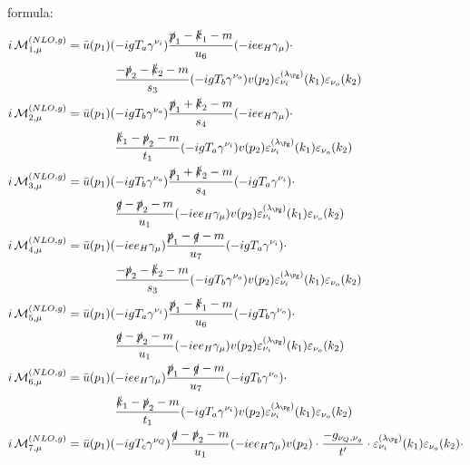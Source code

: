 formula:
\begin{align}
i\Md^{(NLO,g)}_{1,\mu} &= \bar u(p_1)(-igT_a\gamma^{\nu_i})\frac{\slashed{p}_1-\slashed{k}_1-m}{u_6}(-i e e_H \gamma_\mu)\cdot\nonumber\\
 &\hspace{40pt}\frac{-\slashed{p}_2-\slashed{k}_2-m}{s_3}(-igT_b\gamma^{\nu_o})v(p_2)\varepsilon^{(\lambda_{\Pg})}_{\nu_i}(k_1)\varepsilon_{\nu_o}(k_2)\\
i\Md^{(NLO,g)}_{2,\mu} &= \bar u(p_1)(-igT_b\gamma^{\nu_o})\frac{\slashed{p}_1+\slashed{k}_2-m}{s_4}(-i e e_H \gamma_\mu)\cdot\nonumber\\
 &\hspace{40pt}\frac{\slashed{k}_1-\slashed{p}_2-m}{t_1}(-igT_a\gamma^{\nu_i})v(p_2)\varepsilon^{(\lambda_{\Pg})}_{\nu_i}(k_1)\varepsilon_{\nu_o}(k_2)\\
i\Md^{(NLO,g)}_{3,\mu} &= \bar u(p_1)(-igT_b\gamma^{\nu_o})\frac{\slashed{p}_1+\slashed{k}_2-m}{s_4}(-igT_a\gamma^{\nu_i})\cdot\nonumber\\
 &\hspace{40pt}\frac{\slashed{q}-\slashed{p}_2-m}{u_1}(-i e e_H \gamma_\mu)v(p_2)\varepsilon^{(\lambda_{\Pg})}_{\nu_i}(k_1)\varepsilon_{\nu_o}(k_2)\\
i\Md^{(NLO,g)}_{4,\mu} &= \bar u(p_1)(-i e e_H \gamma_\mu)\frac{\slashed{p}_1-\slashed{q}-m}{u_7}(-igT_a\gamma^{\nu_i})\cdot\nonumber\\
 &\hspace{40pt}\frac{-\slashed{p}_2-\slashed{k}_2-m}{s_3}(-igT_b\gamma^{\nu_o})v(p_2)\varepsilon^{(\lambda_{\Pg})}_{\nu_i}(k_1)\varepsilon_{\nu_o}(k_2)\\
i\Md^{(NLO,g)}_{5,\mu} &= \bar u(p_1)(-igT_a\gamma^{\nu_i})\frac{\slashed{p}_1-\slashed{k}_1-m}{u_6}(-igT_b\gamma^{\nu_o})\cdot\nonumber\\
 &\hspace{40pt}\frac{\slashed{q}-\slashed{p}_2-m}{u_1}(-i e e_H \gamma_\mu)v(p_2)\varepsilon^{(\lambda_{\Pg})}_{\nu_i}(k_1)\varepsilon_{\nu_o}(k_2)\\
i\Md^{(NLO,g)}_{6,\mu} &= \bar u(p_1)(-i e e_H \gamma_\mu)\frac{\slashed{p}_1-\slashed{q}-m}{u_7}(-igT_b\gamma^{\nu_o})\cdot\nonumber\\
 &\hspace{40pt}\frac{\slashed{k}_1-\slashed{p}_2-m}{t_1}(-igT_a\gamma^{\nu_i})v(p_2)\varepsilon^{(\lambda_{\Pg})}_{\nu_i}(k_1)\varepsilon_{\nu_o}(k_2)\\
i\Md^{(NLO,g)}_{7,\mu} &= \bar u(p_1)(-igT_c\gamma^{\nu_Q})\frac{\slashed{q}-\slashed{p}_2-m}{u_1}(-i e e_H \gamma_\mu)v(p_2)\cdot\frac{-g_{\nu_Q,\nu_g}}{t'}\cdot\varepsilon^{(\lambda_{\Pg})}_{\nu_i}(k_1)\varepsilon_{\nu_o}(k_2)\cdot\nonumber\\

\end{align}
